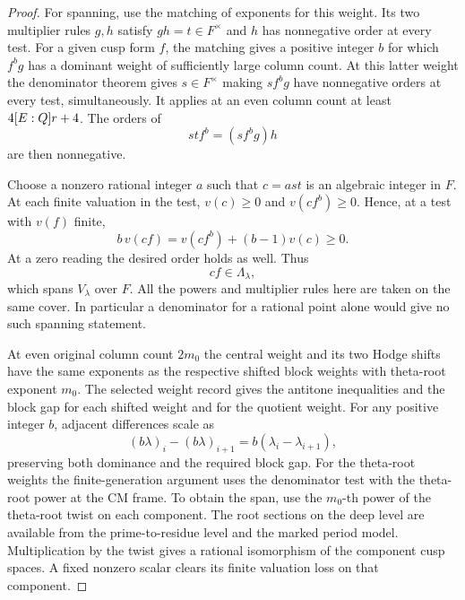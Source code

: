 \begin{proof}
For spanning, use the matching of exponents for this weight.
Its two multiplier rules \(g,h\) satisfy \(gh=t\in F^\times\)
and \(h\) has nonnegative order at every test. For a given
cusp form \(f\), the matching gives a positive integer \(b\)
for which \(f^b g\) has a dominant weight of sufficiently
large column count. At this latter weight the denominator
theorem gives \(s\in F^\times\) making \(s f^b g\) have
nonnegative orders at every test, simultaneously. It
applies at an even column count at least \(4[E:Q]r+4\).
The orders of
\[
 st f^b=(s f^b g)h
\]
are then nonnegative.

Choose a nonzero rational integer \(a\) such that \(c=ast\)
is an algebraic integer in \(F\). At each finite valuation
in the test, \(v(c)\ge0\) and \(v(cf^b)\ge0\). Hence, at a
test with \(v(f)\) finite,
\[
 b\,v(cf)=v(cf^b)+(b-1)v(c)\ge0 .
\]
At a zero reading the desired order holds as well. Thus
\[
 cf\in\Lambda_\lambda,
\]
which spans \(V_\lambda\) over \(F\).
All the powers and multiplier rules here are taken on the
same cover. In particular a denominator for a rational
point alone would give no such spanning statement.
\label{cor:deep-cover-on-core-9}

At even original column count \(2m_0\) the central weight
and its two Hodge shifts have the same exponents as the
respective shifted block weights with theta-root exponent
\(m_0\). The selected weight record gives the antitone
inequalities and the block gap for each shifted weight and
for the quotient weight. For any positive integer \(b\), adjacent differences scale as 
\[
 (b\lambda)_i-(b\lambda)_{i+1}=b(\lambda_i-\lambda_{i+1}),
\]
 preserving both dominance and the required block gap. For the theta-root weights the
finite-generation argument uses the denominator test
with the theta-root power at the CM frame. To obtain the
span, use the \(m_0\)-th power of the theta-root twist
on each component. The root sections on the deep level
are available from the prime-to-residue level and the
marked period model. Multiplication by the twist gives
a rational isomorphism of the component cusp spaces.
A fixed nonzero scalar clears its finite valuation
loss on that component.


\end{proof}
